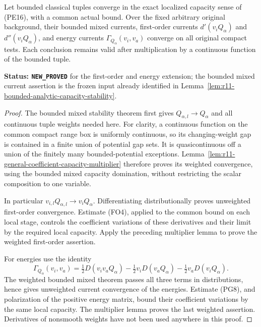 \begin{lemma}
\label{lem:r11-bounded-first-energy-capacity-stability}
Let bounded classical tuples converge in the exact
localized capacity sense of (PE16), with a common actual
bound. Over the fixed arbitrary original background,
their bounded mixed currents, first-order currents
$d'(v_iQ_\alpha)$ and $d''(v_iQ_\alpha)$, and energy
currents $\Gamma_{Q_\alpha}(v_i,v_a)$ converge on all
original compact tests. Each conclusion remains valid
after multiplication by a continuous function of the
bounded tuple.
\end{lemma}

\noindent\textbf{Status: \texttt{NEW\_PROVED}} for the
first-order and energy extension; the bounded mixed
current assertion is the frozen input already identified
in Lemma~\ref{lem:r11-bounded-analytic-capacity-stability}.

\begin{proof}
The bounded mixed stability theorem first gives
$Q_{\alpha,l}\to Q_\alpha$ and all continuous tuple
weights needed here. For clarity, a continuous function
on the common compact range box is uniformly continuous,
so its changing-weight gap is contained in a finite
union of potential gap sets. It is quasicontinuous off
a union of the finitely many bounded-potential exceptions.
Lemma~\ref{lem:r11-general-coefficient-capacity-multiplier}
therefore proves its weighted convergence, using the
bounded mixed capacity domination, without restricting
the scalar composition to one variable.

In particular $v_{i,l}Q_{\alpha,l}\to v_iQ_\alpha$.
Differentiating distributionally proves unweighted
first-order convergence. Estimate (FO4), applied to
the common bound on each local stage, controls the
coefficient variations of these derivatives and their
limit by the required local capacity.
Apply the preceding multiplier lemma to prove the
weighted first-order assertion.

For energies use the identity
\[
 \Gamma_{Q_\alpha}(v_i,v_a)
 =\tfrac12D(v_iv_aQ_\alpha)
       -\tfrac12v_iD(v_aQ_\alpha)
       -\tfrac12v_aD(v_iQ_\alpha).
 \tag{GS2}
\]
The weighted bounded mixed theorem passes all three
terms in distributions, hence gives unweighted current
convergence of the energies. Estimate (PG8), and
polarization of the positive energy matrix, bound
their coefficient variations by the same local
capacity. The multiplier lemma proves the last
weighted assertion. Derivatives of nonsmooth weights
have not been used anywhere in this proof.
\end{proof}

